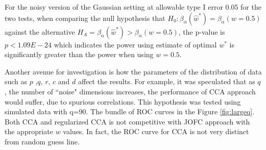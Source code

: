 \documentclass[12pt,oneside,final]{thesis}\usepackage[]{graphicx}\usepackage[]{color}
\begin{document}

For the noisy version of the Gaussian setting at allowable type I error 0.05 for the two tests, when comparing  the null hypothesis that  $H_{0}: \beta_{\alpha}({\hat{w}^*})=\beta_{\alpha}({w=0.5})$ against the alternative $H_{A}=\beta_{\alpha}({\hat{w}^*})>\beta_{\alpha}({w=0.5})$, the p-value is $p<1.09E-24$ which indicates the power using estimate of optimal $w^*$ is significantly greater than the power when using $w=0.5$. 


 Another avenue for investigation is  how the parameters of the distribution of  data such as $p$ ,$q$, $r$, $c$ and $d$ affect the results. For example, it was  speculated that as $q$, the number of   ``noise" dimensions increases, the performance of  CCA approach would suffer, due to spurious correlations. This hypothesis was tested using simulated data with q=90. The  bundle of ROC curves in the Figure \ref{fig:largeq}.  Both CCA and  regularized CCA is not competitive with JOFC approach with the appropriate $w$ values. In fact, the ROC curve for CCA is not very distinct from  random guess line.
\end{document}
